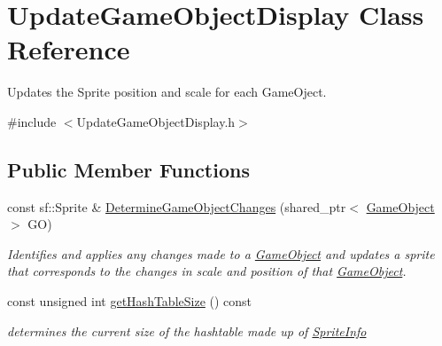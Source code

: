 \hypertarget{class_update_game_object_display}{}\section{Update\+Game\+Object\+Display Class Reference}
\label{class_update_game_object_display}


Updates the Sprite position and scale for each Game\+Oject.  




{\ttfamily \#include $<$Update\+Game\+Object\+Display.\+h$>$}

\subsection*{Public Member Functions}
\begin{DoxyCompactItemize}
\item 
const sf\+::\+Sprite \& \hyperlink{class_update_game_object_display_ac17a26f7563060fb9d4a0eb8959b1d29}{Determine\+Game\+Object\+Changes} (shared\+\_\+ptr$<$ \hyperlink{class_game_object}{Game\+Object} $>$ GO)
\begin{DoxyCompactList}\small\item\em Identifies and applies any changes made to a \hyperlink{class_game_object}{Game\+Object} and updates a sprite that corresponds to the changes in scale and position of that \hyperlink{class_game_object}{Game\+Object}. \end{DoxyCompactList}\item 
const unsigned int \hyperlink{class_update_game_object_display_a84972d99bd8f15ca869fc3710b836283}{get\+Hash\+Table\+Size} () const
\begin{DoxyCompactList}\small\item\em determines the current size of the hashtable made up of \hyperlink{struct_sprite_info}{Sprite\+Info} \end{DoxyCompactList}\end{DoxyCompactItemize}
